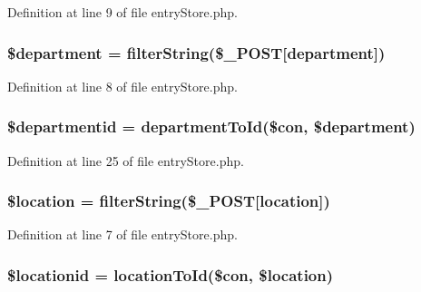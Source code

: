 Definition at line 9 of file entry\+Store.\+php.

\subsubsection[{\texorpdfstring{\$department}{$department}}]{\setlength{\rightskip}{0pt plus 5cm}\$department = {\bf filter\+String}(\$\+\_\+\+P\+O\+ST\mbox{[}\textquotesingle{}department\textquotesingle{}\mbox{]})}\hypertarget{entry_store_8php_af5cc7499478fa9b6d7f9670f6a8521a0}{}\label{entry_store_8php_af5cc7499478fa9b6d7f9670f6a8521a0}


Definition at line 8 of file entry\+Store.\+php.

\subsubsection[{\texorpdfstring{\$departmentid}{$departmentid}}]{\setlength{\rightskip}{0pt plus 5cm}\$departmentid = {\bf department\+To\+Id}(\$con, \$department)}\hypertarget{entry_store_8php_a16d059f286ed0835a8988d28eef36a90}{}\label{entry_store_8php_a16d059f286ed0835a8988d28eef36a90}


Definition at line 25 of file entry\+Store.\+php.

\subsubsection[{\texorpdfstring{\$location}{$location}}]{\setlength{\rightskip}{0pt plus 5cm}\$location = {\bf filter\+String}(\$\+\_\+\+P\+O\+ST\mbox{[}\textquotesingle{}location\textquotesingle{}\mbox{]})}\hypertarget{entry_store_8php_ac319193077976bb217112e5a7b7b8022}{}\label{entry_store_8php_ac319193077976bb217112e5a7b7b8022}


Definition at line 7 of file entry\+Store.\+php.

\subsubsection[{\texorpdfstring{\$locationid}{$locationid}}]{\setlength{\rightskip}{0pt plus 5cm}\$locationid = {\bf location\+To\+Id}(\$con, \$location)}\hypertarget{entry_store_8php_adfb2208f2d8e7ce86dc67d9cd1fa3da3}{}\label{entry_store_8php_adfb2208f2d8e7ce86dc67d9cd1fa3da3}


